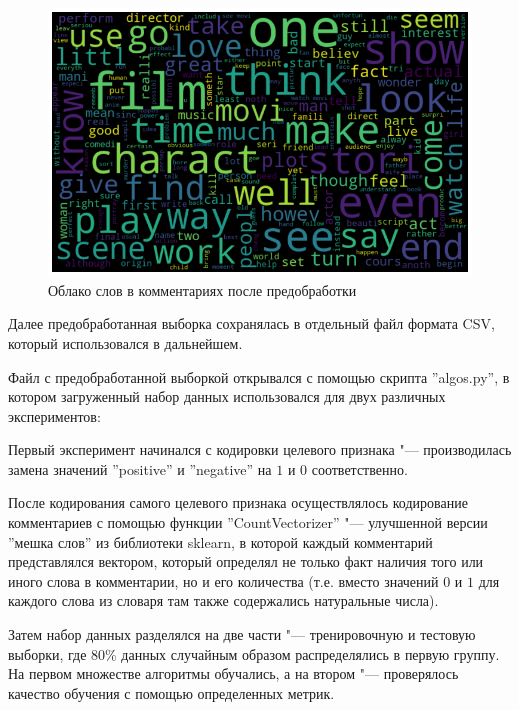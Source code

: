 \documentclass[bachelor, och, coursework]{SCWorks}
\begin{document}
        \begin{figure}[H]
            \centering
            \includegraphics[width=1\textwidth]{pic/cloud.png}
            \caption{Облако слов в комментариях после предобработки}
        \end{figure}

        Далее предобработанная выборка сохранялась в отдельный файл формата CSV,
        который использовался в дальнейшем.

        Файл с предобработанной выборкой открывался с помощью скрипта
        ''algos.py'', в котором загруженный набор данных использовался для двух
        различных экспериментов:
        
        Первый эксперимент начинался с кодировки целевого признака "---
        производилась замена значений ''positive'' и ''negative'' на $1$ и $0$
        соответственно.

        После кодирования самого целевого признака осуществлялось кодирование
        комментариев с помощью функции ''CountVectorizer'' "--- улучшенной
        версии ''мешка слов'' из библиотеки sklearn, в которой каждый
        комментарий представлялся вектором, который определял не только факт
        наличия того или иного слова в комментарии, но и его количества (т.е.
        вместо значений $0$ и $1$ для каждого слова из словаря там также
        содержались натуральные числа).

        Затем набор данных разделялся на две части "--- тренировочную и тестовую
        выборки, где 80\% данных случайным образом распределялись в первую
        группу. На первом множестве алгоритмы обучались, а на втором "---
        проверялось качество обучения с помощью определенных метрик.
\end{document}
